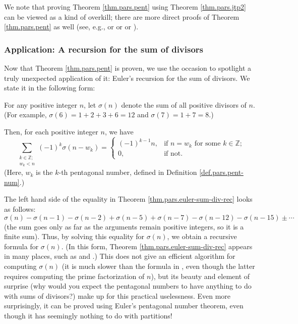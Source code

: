 We note that proving Theorem \ref{thm.pars.pent} using Theorem
\ref{thm.pars.jtp2} can be viewed as a kind of overkill; there are more direct
proofs of Theorem \ref{thm.pars.pent} as well (see, e.g., \cite{Zabroc03} or
\cite[\S 10]{Koch16} or \cite[Exercise 5]{18f-mt3s} or \cite[\S 3]{Bell06}).

\subsubsection{Application: A recursion for the sum of divisors}

Now that Theorem \ref{thm.pars.pent} is proven, we use the occasion to
spotlight a truly unexpected application of it: Euler's recursion for the sum
of divisors. We state it in the following form:

\begin{theorem}
\label{thm.pars.euler-sum-div-rec}For any positive integer $n$, let
$\sigma\left(  n\right)  $ denote the sum of all positive divisors of $n$.
(For example, $\sigma\left(  6\right)  =1+2+3+6=12$ and $\sigma\left(
7\right)  =1+7=8$.)

Then, for each positive integer $n$, we have%
\[
\sum_{\substack{k\in\mathbb{Z};\\w_{k}<n}}\left(  -1\right)  ^{k}\sigma\left(
n-w_{k}\right)  =%
\begin{cases}
\left(  -1\right)  ^{k-1}n, & \text{if }n=w_{k}\text{ for some }k\in
\mathbb{Z};\\
0, & \text{if not.}%
\end{cases}
\]
(Here, $w_{k}$ is the $k$-th pentagonal number, defined in Definition
\ref{def.pars.pent-num}.)
\end{theorem}

The left hand side of the equality in Theorem \ref{thm.pars.euler-sum-div-rec}
looks as follows:%
\[
\sigma\left(  n\right)  -\sigma\left(  n-1\right)  -\sigma\left(  n-2\right)
+\sigma\left(  n-5\right)  +\sigma\left(  n-7\right)  -\sigma\left(
n-12\right)  -\sigma\left(  n-15\right)  \pm\cdots
\]
(the sum goes only as far as the arguments remain positive integers, so it is
a finite sum). Thus, by solving this equality for $\sigma\left(  n\right)  $,
we obtain a recursive formula for $\sigma\left(  n\right)  $. (In this form,
Theorem \ref{thm.pars.euler-sum-div-rec} appears in many places, such as
\cite[\S 23]{Ness61} and \cite[Theorem 37]{Johnso20}.) This does not give an
efficient algorithm for computing $\sigma\left(  n\right)  $ (it is much
slower than the formula in \cite[Exercise 2.18.1 \textbf{(b)}]{19s}, even
though the latter requires computing the prime factorization of $n$), but its
beauty and element of surprise (why would you expect the pentagonal numbers to
have anything to do with sums of divisors?) make up for this practical
uselessness. Even more surprisingly, it can be proved using Euler's pentagonal
number theorem, even though it has seemingly nothing to do with partitions!


